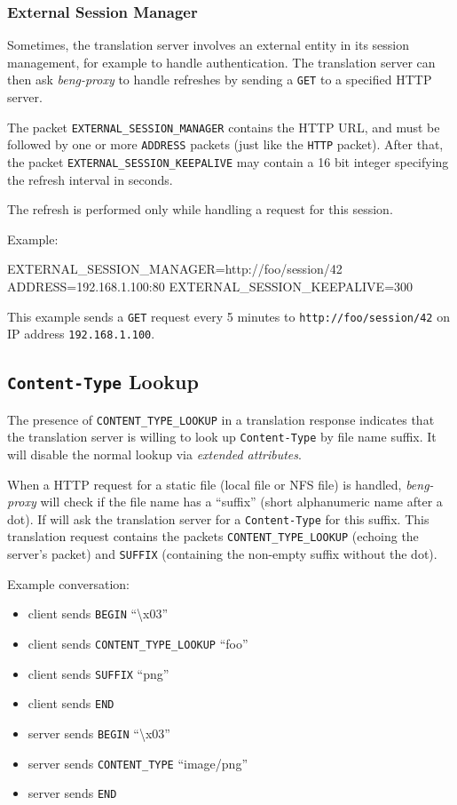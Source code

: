 \documentclass[a4paper,12pt]{article}
\begin{document}
\subsubsection{External Session Manager}

Sometimes, the translation server involves an external entity in its
session management, for example to handle authentication.  The
translation server can then ask \emph{beng-proxy} to handle refreshes
by sending a \texttt{GET} to a specified HTTP server.

The packet \verb|EXTERNAL_SESSION_MANAGER| contains the HTTP URL, and
must be followed by one or more \verb|ADDRESS| packets (just like the
\verb|HTTP| packet).  After that, the packet
\verb|EXTERNAL_SESSION_KEEPALIVE| may contain a 16 bit integer
specifying the refresh interval in seconds.

The refresh is performed only while handling a request for this
session.

Example:

\begin{verbatim*}
EXTERNAL_SESSION_MANAGER=http://foo/session/42
ADDRESS=192.168.1.100:80
EXTERNAL_SESSION_KEEPALIVE=300
\end{verbatim*}

This example sends a \verb|GET| request every 5 minutes to
\texttt{http://foo/session/42} on IP address \texttt{192.168.1.100}.

\subsection{\texttt{Content-Type} Lookup}
\label{ctlookup}

The presence of \verb|CONTENT_TYPE_LOOKUP| in a translation response
indicates that the translation server is willing to look up
\texttt{Content-Type} by file name suffix.  It will disable the normal
lookup via \textit{extended attributes}.

When a HTTP request for a static file (local file or NFS file) is
handled, \emph{beng-proxy} will check if the file name has a
``suffix'' (short alphanumeric name after a dot).  If will ask the
translation server for a \texttt{Content-Type} for this suffix.  This
translation request contains the packets \verb|CONTENT_TYPE_LOOKUP|
(echoing the server's packet) and \verb|SUFFIX| (containing the
non-empty suffix without the dot).

Example conversation:

\begin{itemize}
\item client sends \verb|BEGIN| ``\textbackslash{}x03''
\item client sends \verb|CONTENT_TYPE_LOOKUP| ``foo''
\item client sends \verb|SUFFIX| ``png''
\item client sends \verb|END|
\item server sends \verb|BEGIN| ``\textbackslash{}x03''
\item server sends \verb|CONTENT_TYPE| ``image/png''
\item server sends \verb|END|
\end{itemize}
\end{document}
